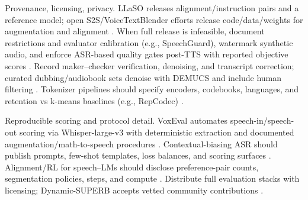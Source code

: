 \documentclass{article}
\begin{document}
Provenance, licensing, privacy. LLaSO releases alignment/instruction pairs and a reference model; open S2S/VoiceTextBlender efforts release code/data/weights for augmentation and alignment \cite{sun2025llasofoundationalframeworkreproduciblere,peng2025voicetextblenderaugmentinglargelanguagem}. When full release is infeasible, document restrictions and evaluator calibration (e.g., SpeechGuard), watermark synthetic audio, and enforce ASR-based quality gates post-TTS with reported objective scores \cite{peri2024speechguardexploringadversarialrobustnes,zhao2024advancingspeechlanguagemodelsscalingsupe}. Record maker--checker verification, denoising, and transcript correction; curated dubbing/audiobook sets denoise with DEMUCS and include human filtering \cite{huang2023holisticcascadesystembenchmarkhumanevalu}. Tokenizer pipelines should specify encoders, codebooks, languages, and retention vs k-means baselines (e.g., RepCodec) \cite{huang2024repcodecspeechrepresentationcodectokeniz}.

Reproducible scoring and protocol detail. VoxEval automates speech-in/speech-out scoring via Whisper-large-v3 with deterministic extraction and documented augmentation/math-to-speech procedures \cite{cui2025voxevalbenchmarkingknowledgeunderstandin}. Contextual-biasing ASR should publish prompts, few-shot templates, loss balances, and scoring surfaces \cite{sun2023contextualbiasingnamedentitieslargelangu}. Alignment/RL for speech--LMs should disclose preference-pair counts, segmentation policies, steps, and compute \cite{lin2025alignslmtextlessspokenlanguagemodelsrein}. Distribute full evaluation stacks with licensing; Dynamic-SUPERB accepts vetted community contributions \cite{huang2025dynamicsuperbphase2collaborativelyexpand}.
\end{document}
